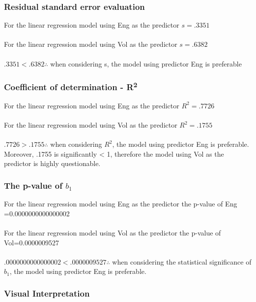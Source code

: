 \documentclass{article}
\begin{document}
\subsubsection*{Residual standard error evaluation}
For the linear regression model using Eng as the predictor $s=.3351$
\\\\
For the linear regression model using Vol as the predictor $s=.6382$
\\\\
$.3351 < .6382 \therefore  $ when considering s, the model using predictor Eng is preferable

\subsubsection*{Coefficient of determination - R\textsuperscript{2}}
For the linear regression model using Eng as the predictor $R^2=.7726$
\\\\
For the linear regression model using Vol as the predictor $R^2=.1755$
\\\\
$.7726 > .1755 \therefore  $ when considering $R^2$, the model using predictor Eng is preferable. Moreover, .1755 is significantly < 1, therefore the model using Vol as the predictor is highly questionable. 

\subsubsection*{The p-value of $b_{1}$}
For the linear regression model using Eng as the predictor the p-value of Eng =0.0000000000000002
\\\\
For the linear regression model using Vol as the predictor the p-value of Vol=0.0000009527
\\\\
$.0000000000000002 < .0000009527 \therefore  $ when considering the statistical significance of $b_{1}$, the model using predictor Eng is preferable. 

\subsubsection*{Visual Interpretation}
\end{document}
